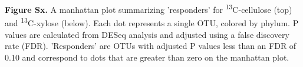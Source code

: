 \textbf{Figure Sx.} A manhattan plot summarizing 'responders' for \textsuperscript{13}C-cellulose (top) and \textsuperscript{13}C-xylose (below).  Each dot represents a single OTU, colored by phylum. P values are calculated from DESeq analysis and adjusted using a false discovery rate (FDR). 'Responders' are OTUs with adjusted P values less than an FDR of 0.10 and correspond to dots that are greater than zero on the manhattan plot.     